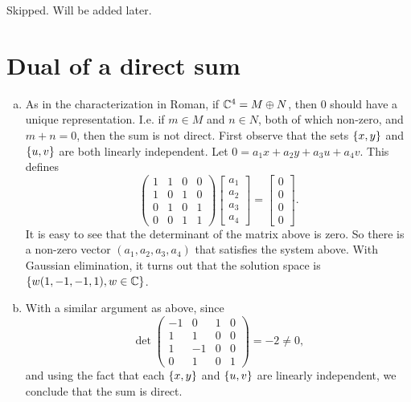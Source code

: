 \begin{problem}
	{\color{red} \noindent Skipped. Will be added later}.
\end{problem}



\newpage


\section{Dual of a direct sum}
\begin{problem}
	\begin{solution}
		
		\begin{enumerate}[(a)]
			\item As in the characterization in Roman, if $ \mathbb{C}^4 = M\oplus N $, then $ 0 $ should have a unique representation. I.e. if $ m\in M $ and $ n\in N $, both of which non-zero, and $ m+n = 0 $, then the sum is not direct. First observe that the sets $ \{x,y\} $ and $ \{u,v\} $ are both linearly independent. Let $ 0 = a_1x + a_2y + a_3u + a_4v $. This defines
			\[ \begin{pmatrix}
				1 & 1 & 0 & 0 \\
				1 & 0 & 1 & 0 \\
				0 & 1 & 0 & 1 \\
				0 & 0 & 1 & 1 
			\end{pmatrix}
			\begin{bmatrix}
				a_1 \\ a_2 \\ a_3 \\ a_4
			\end{bmatrix}
			= 
			\begin{bmatrix}
				0 \\ 0 \\ 0 \\ 0 
			\end{bmatrix}.
			\]
			It is easy to see that the determinant of the matrix above is zero. So there is a non-zero vector $ (a_1,a_2,a_3,a_4) $ that satisfies the system above. With Gaussian elimination, it turns out that the solution space is $ \{w(1,-1,-1,1), w\in \mathbb{C}\} $.
			
			\item With a similar argument as above, since
			\[ \det 
			\begin{pmatrix}
				-1 & 0 & 1 & 0 \\
				1 & 1 & 0 & 0 \\
				1 & -1 & 0 & 0 \\
				0 & 1 & 0 & 1
			\end{pmatrix} = -2 \neq 0, \]
			and using the fact that each $ \{x,y\} $ and $ \{u,v\} $ are linearly independent, we conclude that the sum is direct.
			

\end{enumerate}
\end{solution}
\end{problem}

